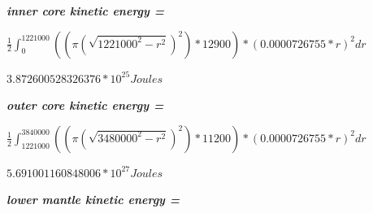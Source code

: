 \documentclass[a4paper, 11pt, oneside]{book} %
\begin{document}
\vspace{0.5\baselineskip} %
\vspace{0.5\baselineskip} %
\textbf{\textit{inner core kinetic energy = }}\\

\vspace{0.5\baselineskip} %
\vspace{0.5\baselineskip} %

$\frac{1}{2} \int_{0}^{1221000} ((\pi(\sqrt{1221000^2-r^2})^2) * 12900) * (0.0000726755 * r)^2 dr$\\

\vspace{0.5\baselineskip} %
\vspace{0.5\baselineskip} %

$3.872600528326376*10^{25} Joules$

\vspace{0.5\baselineskip} %
\vspace{0.5\baselineskip} %
\textbf{\textit{outer core kinetic energy = }}\\

\vspace{0.5\baselineskip} %
\vspace{0.5\baselineskip} %

$\frac{1}{2} \int_{1221000}^{3840000} ((\pi(\sqrt{3480000^2-r^2})^2) * 11200) * (0.0000726755 * r)^2 dr$\\

\vspace{0.5\baselineskip} %
\vspace{0.5\baselineskip} %

$5.691001160848006*10^{27} Joules$

\vspace{0.5\baselineskip} %
\vspace{0.5\baselineskip} %
\textbf{\textit{lower mantle kinetic energy = }}\\
\end{document}
